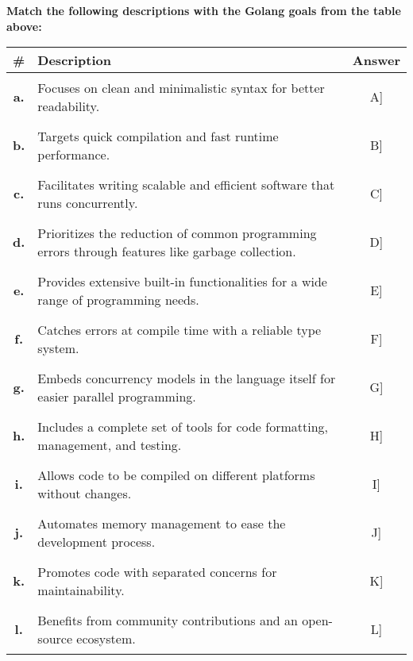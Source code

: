 \documentclass[12pt, addpoints, answers]{exam}
\newif\ifprintanswers
\newcommand{\fillin}[1]{%
  \ifprintanswers
    \textbf{#1}%
  \else
    \underline{\hspace{2mm}}%
  \fi
}
\begin{document}
\begin{questions}
	\question \textbf{Match the following descriptions with the Golang goals from the table above:}
	\begin{table}[h]
		\centering
\small
\setlength{\tabcolsep}{5pt} %
\renewcommand{\arraystretch}{1} %
		\begin{tabular}{|c|p{12cm}|c|}
			\hline
			\#  & \textbf{Description}                                                                             & \textbf{Answer}            \\ \hline
		\textbf{	a.}  & Focuses on clean and minimalistic syntax for better readability.                                 & \rule{0pt}{.8cm}\fillin[A] \\ \hline
		\textbf{	b.}  & Targets quick compilation and fast runtime performance.                                          & \rule{0pt}{.8cm}\fillin[B] \\ \hline
		\textbf{	c.}  & Facilitates writing scalable and efficient software that runs concurrently.                      & \rule{0pt}{.8cm}\fillin[C] \\ \hline
		\textbf{	d.}  & Prioritizes the reduction of common programming errors through features like garbage collection. & \rule{0pt}{.8cm}\fillin[D] \\ \hline
		\textbf{	e.}  & Provides extensive built-in functionalities for a wide range of programming needs.               & \rule{0pt}{.8cm}\fillin[E] \\ \hline
		\textbf{	f.}  & Catches errors at compile time with a reliable type system.                                      & \rule{0pt}{.8cm}\fillin[F] \\ \hline
		\textbf{	g.}  & Embeds concurrency models in the language itself for easier parallel programming.                & \rule{0pt}{.8cm}\fillin[G] \\ \hline
		\textbf{	h.}  & Includes a complete set of tools for code formatting, management, and testing.                   & \rule{0pt}{.8cm}\fillin[H] \\ \hline
		\textbf{	i.}  & Allows code to be compiled on different platforms without changes.                               & \rule{0pt}{.8cm}\fillin[I] \\ \hline
		\textbf{	j.} & Automates memory management to ease the development process.                                     & \rule{0pt}{.8cm}\fillin[J] \\ \hline
		\textbf{	k.} & Promotes code with separated concerns for maintainability.                                       & \rule{0pt}{.8cm}\fillin[K] \\ \hline
		\textbf{	l.} & Benefits from community contributions and an open-source ecosystem.                              & \rule{0pt}{.8cm}\fillin[L] \\ \hline
		\end{tabular}
	\end{table}
	\newpage
 

\end{questions}
\end{document}
